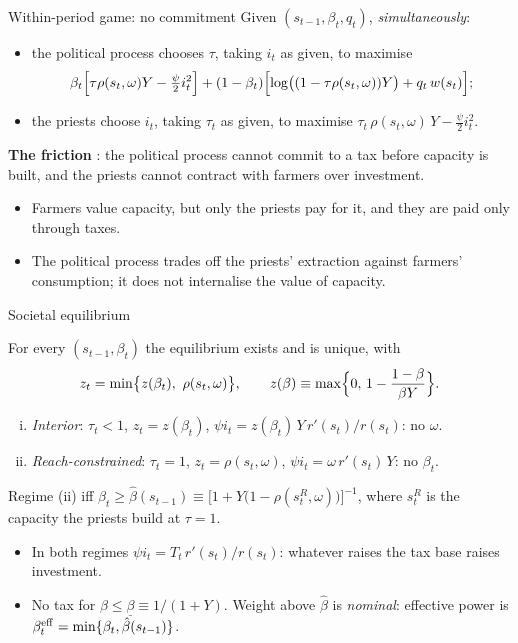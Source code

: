 \documentclass[11pt,aspectratio=169]{beamer}
\begin{document}
\begin{frame}{Within-period game: no commitment}
Given $(s_{t-1},\beta_t,q_t)$, \emph{simultaneously}:
\begin{itemize}
\item the political process chooses $\tau$, taking $i_t$ as given, to maximise
\[
\beta_t\Bigl[\tau\rho(s_t,\omega)Y-\tfrac{\psi}{2}i_t^2\Bigr]
+(1-\beta_t)\Bigl[\log\bigl((1-\tau\rho(s_t,\omega))Y\bigr)+q_t\,w(s_t)\Bigr];
\]
\item the priests choose $i_t$, taking $\tau_t$ as given, to maximise
$\tau_t\,\rho(s_t,\omega)\,Y-\tfrac{\psi}{2}i_t^2$.
\end{itemize}
\medskip
\textbf{The friction} \citep[as in][]{bisin2024joint}: the political process cannot commit to a tax
before capacity is built, and the priests cannot contract with farmers over investment.
\begin{itemize}
\item Farmers value capacity, but only the priests pay for it, and they are paid only through
taxes.
\item The political process trades off the priests' extraction against farmers' consumption; it
does not internalise the value of capacity.
\end{itemize}
\end{frame}

\begin{frame}{Societal equilibrium}
\begin{lemma}
For every $(s_{t-1},\beta_t)$ the equilibrium exists and is unique, with
\[
z_t=\min\bigl\{z(\beta_t),\ \rho(s_t,\omega)\bigr\},\qquad
z(\beta)\equiv\max\Bigl\{0,\,1-\frac{1-\beta}{\beta Y}\Bigr\}.
\]
\begin{enumerate}[(i)]
\item \emph{Interior}: $\tau_t<1$, $z_t=z(\beta_t)$, $\psi i_t=z(\beta_t)\,Y\,r'(s_t)/r(s_t)$:
no $\omega$.
\item \emph{Reach-constrained}: $\tau_t=1$, $z_t=\rho(s_t,\omega)$, $\psi i_t=\omega\,r'(s_t)\,Y$:
no $\beta_t$.
\end{enumerate}
Regime (ii) iff $\beta_t\ge\hat\beta(s_{t-1})\equiv\bigl[1+Y\bigl(1-\rho(s^R_t,\omega)\bigr)\bigr]^{-1}$,
where $s^R_t$ is the capacity the priests build at $\tau=1$.
\end{lemma}
\begin{itemize}
\item In both regimes $\psi i_t=T_t\,r'(s_t)/r(s_t)$: whatever raises the tax base raises
investment.
\item No tax for $\beta\le\underline\beta\equiv1/(1+Y)$. Weight above $\hat\beta$ is
\emph{nominal}: effective power is $\beta^{\rm eff}_t=\min\{\beta_t,\hat\beta(s_{t-1})\}$.
\end{itemize}
\end{frame}
\end{document}
